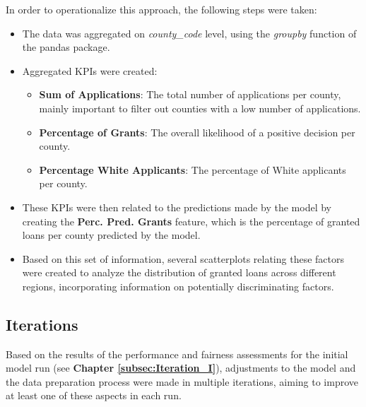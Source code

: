 In order to operationalize this approach, the following steps were taken:
\begin{itemize}
    \item The data was aggregated on \textit{county\_code} level, using the \textit{groupby} function of the pandas package.
    \item Aggregated KPIs were created: 
    \begin{itemize}
        \item \textbf{Sum of Applications}: The total number of applications per county, mainly important to filter out counties with a low number of applications.
        \item \textbf{Percentage of Grants}: The overall likelihood of a positive decision per county.
        \item \textbf{Percentage White Applicants}: The percentage of White applicants per county.
    \end{itemize}
    \item These KPIs were then related to the predictions made by the model by creating the \textbf{Perc. Pred. Grants} feature, which is the percentage of granted loans per county predicted by the model.
    \item Based on this set of information, several scatterplots relating these factors were created to analyze the distribution of granted loans across different regions, incorporating information on potentially discriminating factors. 
\end{itemize}

\subsection{Iterations}\label{subsec:Iterations}


Based on the results of the performance and fairness assessments for the initial model run (see \textbf{Chapter \ref{subsec:Iteration_I}}), adjustments to the model and the data preparation process were made in multiple iterations, aiming to improve at least one of these aspects in each run.

